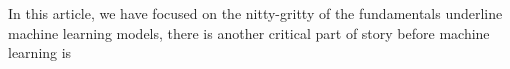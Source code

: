 In this article, we have focused on the nitty-gritty of the fundamentals underline machine learning models, there is another critical part of story before machine learning is  